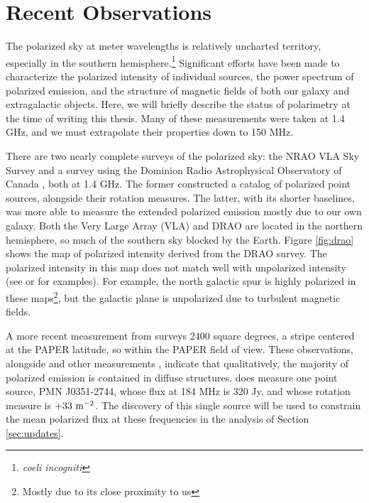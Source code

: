 \section{Recent Observations}\label{sec:PolStatus}
The polarized sky at meter wavelengths is relatively uncharted
territory, especially in the southern hemisphere.\footnote{\emph{coeli incogniti}} 
Significant efforts have been made to characterize the polarized intensity of individual sources,
the power spectrum of polarized emission, and the structure of
magnetic fields of both our galaxy and extragalactic objects. Here, we will briefly describe the
status of polarimetry at the time of writing this thesis. Many of these measurements were taken at
1.4 GHz, and we must extrapolate their properties down to 150 MHz.

There are two nearly complete surveys of the polarized sky: the NRAO VLA Sky 
Survey \cite[NVSS,][]{NVSS} and a survey using the Dominion 
Radio Astrophysical Observatory of Canada \cite[DRAO,][]{Wolleben2005}, both at 1.4 GHz. The former constructed a catalog of
polarized point sources, alongside their rotation measures. The latter, with its shorter baselines,
was more able to measure the extended polarized emission mostly due to our own galaxy. Both the
Very Large Array (VLA) and DRAO are located in the northern
hemisphere, so much of the southern sky blocked by the Earth. Figure \ref{fig:drao} shows the map of
polarized intensity derived from the DRAO survey\cite{Wolleben2005}. The polarized intensity in this map does 
not match well with unpolarized intensity (see \citet{Haslam} or \citet{dOCMap} for examples). For 
example, the north galactic spur is highly polarized in these maps\footnote{Mostly due to its 
close proximity to us}, but the galactic plane is unpolarized due to turbulent magnetic fields. 

A more recent measurement from \citet{Bernardi2013} surveys 2400 square degrees, a stripe centered
at the PAPER latitude, so within the PAPER field of view. These observations, alongside 
\citet{Wolleben2005} and other measurements \cite[][e.g.]{Jelic2014}, indicate that qualitatively, 
the majority of polarized emission is contained in diffuse structures. \citet{Bernardi2013} does 
measure one point source, PMN J0351-2744, whose flux at 184 MHz is 320 Jy, and whose rotation measure is 
$+33\ {\rm m}^{-2}$. The discovery of this single source will be used to constrain the mean polarized 
flux at these frequencies in the analysis of Section \ref{sec:updates}. 

